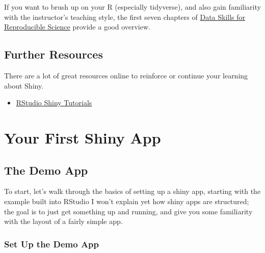 \documentclass[
]{book}
\providecommand{\tightlist}{%
  \setlength{\itemsep}{0pt}\setlength{\parskip}{0pt}}
\begin{document}
If you want to brush up on your R (especially tidyverse), and also gain familiarity with the instructor's teaching style, the first seven chapters of \href{https://psyteachr.github.io/msc-data-skills/}{Data Skills for Reproducible Science} provide a good overview.

\hypertarget{further-resources}{%
\section{Further Resources}\label{further-resources}}

There are a lot of great resources online to reinforce or continue your learning about Shiny.

\begin{itemize}
\tightlist
\item
  \href{https://shiny.rstudio.com/tutorial/}{RStudio Shiny Tutorials}
\end{itemize}

\hypertarget{first-app}{%
\chapter{Your First Shiny App}\label{first-app}}

\hypertarget{the-demo-app}{%
\section{The Demo App}\label{the-demo-app}}

To start, let's walk through the basics of setting up a shiny app, starting with the example built into RStudio I won't explain yet how shiny apps are structured; the goal is to just get something up and running, and give you some familiarity with the layout of a fairly simple app.

\hypertarget{set-up-the-demo-app}{%
\subsection{Set Up the Demo App}\label{set-up-the-demo-app}}
\end{document}
